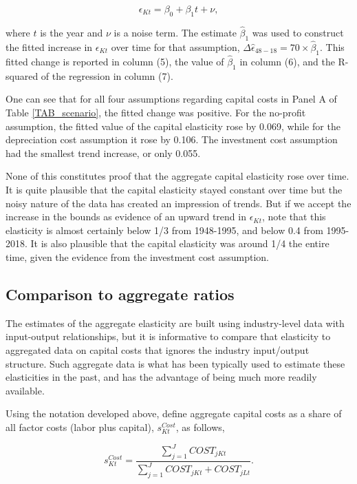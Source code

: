 \documentclass[11pt]{article}
\begin{document}
\begin{equation}
	\epsilon_{Kt} = \beta_0 + \beta_1 t + \nu,
\end{equation}

where $t$ is the year and $\nu$ is a noise term. The estimate $\hat{\beta}_1$ was used to construct the fitted increase in $\epsilon_{Kt}$ over time for that assumption, $\Delta \hat{\epsilon}_{48-18} = 70 \times \hat{\beta}_1$. This fitted change is reported in column (5), the value of $\hat{\beta}_1$ in column (6), and the R-squared of the regression in column (7). 

One can see that for all four assumptions regarding capital costs in Panel A of Table \ref{TAB_scenario}, the fitted change was positive. For the no-profit assumption, the fitted value of the capital elasticity rose by 0.069, while for the depreciation cost assumption it rose by 0.106. The investment cost assumption had the smallest trend increase, or only 0.055. 

None of this constitutes proof that the aggregate capital elasticity rose over time. It is quite plausible that the capital elasticity stayed constant over time but the noisy nature of the data has created an impression of trends. But if we accept the increase in the bounds as evidence of an upward trend in $\epsilon_{Kt}$, note that this elasticity is almost certainly below 1/3 from 1948-1995, and below 0.4 from 1995-2018. It is also plausible that the capital elasticity was around 1/4 the entire time, given the evidence from the investment cost assumption.

\subsection{Comparison to aggregate ratios}
The estimates of the aggregate elasticity are built using industry-level data with input-output relationships, but it is informative to compare that elasticity to aggregated data on capital costs that ignores the industry input/output structure. Such aggregate data is what has been typically used to estimate these elasticities in the past, and has the advantage of being much more readily available.

Using the notation developed above, define aggregate capital costs as a share of all factor costs (labor plus capital), $s^{Cost}_{Kt}$, as follows,

\begin{equation}
	s^{Cost}_{Kt} = \frac{\sum_{j=1}^{J} COST_{jKt}}{\sum_{j=1}^{J} COST_{jKt} + COST_{jLt}}. \label{EQ_scost}
\end{equation}
\end{document}

